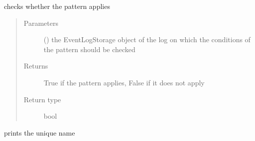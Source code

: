 \documentclass[letterpaper,10pt,english]{sphinxmanual}
\begin{document}
\begin{fulllineitems}
\begin{fulllineitems}
\label{\detokenize{event_log_analyzer:event_log_analyzer.pattern_library.pattern.Pattern.pattern_applies}}
\sphinxAtStartPar
checks whether the pattern applies
\begin{quote}\begin{description}
\item[{Parameters}] \leavevmode
\sphinxAtStartPar
{} ({\hyperref[\detokenize{event_log_analyzer:event_log_analyzer.event_log.EventLogStorage}]{}}) \textendash{} the EventLogStorage object of the log on which the conditions of the pattern should be checked

\item[{Returns}] \leavevmode
\sphinxAtStartPar
True if the pattern applies, False if it does not apply

\item[{Return type}] \leavevmode
\sphinxAtStartPar
bool

\end{description}\end{quote}

\end{fulllineitems}


\begin{fulllineitems}
\label{\detokenize{event_log_analyzer:event_log_analyzer.pattern_library.pattern.Pattern.print_name}}
\sphinxAtStartPar
prints the unique name

\end{fulllineitems}


\end{fulllineitems}
\end{document}
